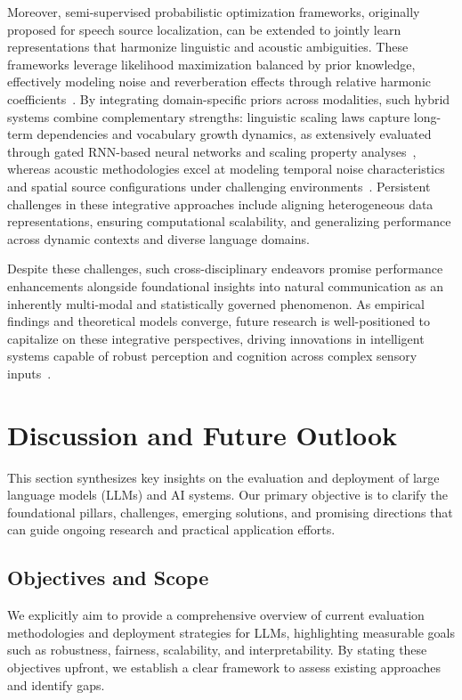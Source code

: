 \documentclass[sigconf]{acmart}
\begin{document}
Moreover, semi-supervised probabilistic optimization frameworks, originally proposed for speech source localization, can be extended to jointly learn representations that harmonize linguistic and acoustic ambiguities. These frameworks leverage likelihood maximization balanced by prior knowledge, effectively modeling noise and reverberation effects through relative harmonic coefficients~\cite{ref52}. By integrating domain-specific priors across modalities, such hybrid systems combine complementary strengths: linguistic scaling laws capture long-term dependencies and vocabulary growth dynamics, as extensively evaluated through gated RNN-based neural networks and scaling property analyses~\cite{ref51}, whereas acoustic methodologies excel at modeling temporal noise characteristics and spatial source configurations under challenging environments~\cite{ref52}. Persistent challenges in these integrative approaches include aligning heterogeneous data representations, ensuring computational scalability, and generalizing performance across dynamic contexts and diverse language domains.

Despite these challenges, such cross-disciplinary endeavors promise performance enhancements alongside foundational insights into natural communication as an inherently multi-modal and statistically governed phenomenon. As empirical findings and theoretical models converge, future research is well-positioned to capitalize on these integrative perspectives, driving innovations in intelligent systems capable of robust perception and cognition across complex sensory inputs~\cite{ref51,ref52}.

\section{Discussion and Future Outlook}

This section synthesizes key insights on the evaluation and deployment of large language models (LLMs) and AI systems. Our primary objective is to clarify the foundational pillars, challenges, emerging solutions, and promising directions that can guide ongoing research and practical application efforts.

\subsection{Objectives and Scope}
We explicitly aim to provide a comprehensive overview of current evaluation methodologies and deployment strategies for LLMs, highlighting measurable goals such as robustness, fairness, scalability, and interpretability. By stating these objectives upfront, we establish a clear framework to assess existing approaches and identify gaps.
\end{document}
